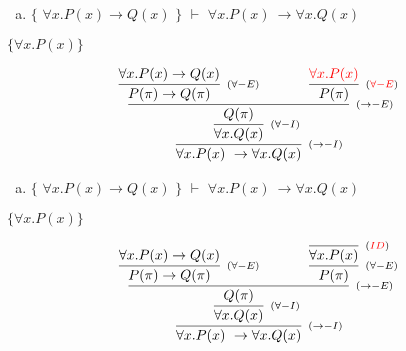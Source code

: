 \documentclass[aspectratio=43]{beamer}
\begin{document}
    \begin{frame}[fragile]
    
    	\begin{enumerate}[f)]
			\item $\{$ $\forall x.P(x)\to Q(x) $ $\}$ $\vdash$ $ \forall x.P(x)\ \to \forall x.Q(x) $ \\
		\end{enumerate}
        $ \{\forall x.P(x)\} $
        \vspace{40pt}
        
        \[
        \begin{array}{c}
		
        	\infer[_{(\to -I)}]
            	{\forall x.P(x)\ \to \forall x.Q(x)}
            	{\infer[_{(\forall -I)}] 
                	{\forall x.Q(x)}
                    {\infer[_{(\to -E)}]
                    	{Q(\pi)}
                        {\infer[_{(\forall -E)}]
                        	{P(\pi)\rightarrow Q(\pi)}
                            {\forall x.P(x)\to Q(x)}
                        \hspace{35pt} 
                        \infer[_{(\textcolor{red}{\forall -E})}] 
                        	{P(\pi)}
                            {\textcolor{red}{\forall x.P(x)}}
                        }
                    }
                 }   
        
		\end{array}
        \]
        
	\end{frame}
    
    \begin{frame}[fragile]
    
    	\begin{enumerate}[f)]
			\item $\{$ $\forall x.P(x)\to Q(x) $ $\}$ $\vdash$ $ \forall x.P(x)\ \to \forall x.Q(x) $ \\
		\end{enumerate}
        $ \{\forall x.P(x)\} $
        \vspace{40pt}
        
        \[
        \begin{array}{c}
		
        	\infer[_{(\to -I)}]
            	{\forall x.P(x)\ \to \forall x.Q(x)}
            	{\infer[_{(\forall -I)}] 
                	{\forall x.Q(x)}
                    {\infer[_{(\to -E)}]
                    	{Q(\pi)}
                        {\infer[_{(\forall -E)}]
                        	{P(\pi)\rightarrow Q(\pi)}
                            {\forall x.P(x)\to Q(x)}
                        \hspace{35pt} 
                        \infer[_{(\forall -E)}] 
                        	{P(\pi)}
                            {\infer[_{(\textcolor{red}{ID})}]
                            	{\forall x.P(x)}
                                {}
                            }
                        }
                    }
                 }   
        
		\end{array}
        \]
        
	\end{frame}
    
\end{document}
